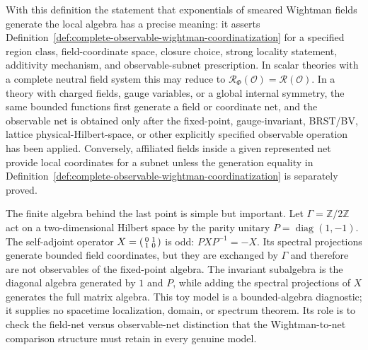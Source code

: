 With this definition the statement that exponentials of smeared Wightman
fields generate the local algebra has a precise meaning: it asserts
Definition~\ref{def:complete-observable-wightman-coordinatization} for a
specified region class, field-coordinate space, closure choice, strong
locality statement, additivity mechanism, and observable-subnet prescription.
In scalar theories with a complete neutral field system this may reduce to
\(\mathcal R_\Phi(\mathcal O)=\mathcal R(\mathcal O)\).  In a theory with
charged fields, gauge variables, or a global internal symmetry, the same
bounded functions first generate a field or coordinate net, and the
observable net is obtained only after the fixed-point, gauge-invariant,
BRST/BV, lattice physical-Hilbert-space, or other explicitly specified
observable operation has been applied.  Conversely, affiliated fields inside a
given represented net provide local coordinates for a subnet unless the
generation equality in Definition~\ref{def:complete-observable-wightman-coordinatization}
is separately proved.

The finite algebra behind the last point is simple but important.  Let
\(\Gamma=\mathbb Z/2\mathbb Z\) act on a two-dimensional Hilbert space by the
parity unitary \(P=\operatorname{diag}(1,-1)\).  The self-adjoint operator
\(X=\begin{psmallmatrix}0&1\\1&0\end{psmallmatrix}\) is odd:
\(PXP^{-1}=-X\).  Its spectral projections generate bounded field
coordinates, but they are exchanged by \(\Gamma\) and therefore are not
observables of the fixed-point algebra.  The invariant subalgebra is the
diagonal algebra generated by \(1\) and \(P\), while adding the spectral
projections of \(X\) generates the full matrix algebra.  This toy model is
a bounded-algebra diagnostic; it supplies no spacetime localization,
domain, or spectrum theorem.  Its role is to check the field-net versus
observable-net distinction that the Wightman-to-net comparison structure must
retain in every genuine model.

